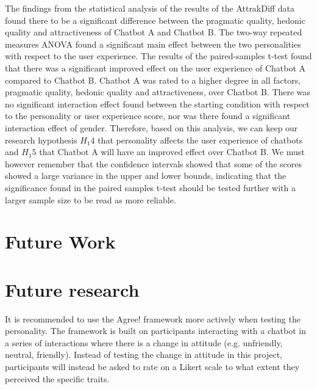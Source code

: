 The findings from the statistical analysis of the results of the AttrakDiff data found there to be a significant difference between the pragmatic quality, hedonic quality and attractiveness of Chatbot A and Chatbot B. The two-way repeated measures ANOVA found a significant main effect between the two personalities with respect to the user experience. The results of the paired-samples t-test found that there was a significant improved effect on the user experience of Chatbot A compared to Chatbot B. Chatbot A was rated to a higher degree in all factors, pragmatic quality, hedonic quality and attractiveness, over Chatbot B. There was no significant interaction effect found between the starting condition with respect to the personality or user experience score, nor was there found a significant interaction effect of gender. Therefore, based on this analysis, we can keep our research hypothesis $H_1 4$ that personality affects the user experience of chatbots and $H_1 5$ that Chatbot A will have an improved effect over Chatbot B. We must however remember that the confidence intervals showed that some of the scores showed a large variance in the upper and lower bounds, indicating that the significance found in the paired samples t-test should be tested further with a larger sample size to be read as more reliable.

\section{Future Work}
\label{sec:future}
\section{Future research}

It is recommended to use the Agree! framework \citep{Callejas2014} more actively when testing the personality. The framework is built on participants interacting with a chatbot in a series of interactions where there is a change in attitude (e.g. unfriendly, neutral, friendly). Instead of testing the change in attitude in this project, participants will instead be asked to rate on a Likert scale to what extent they perceived the specific traits.
